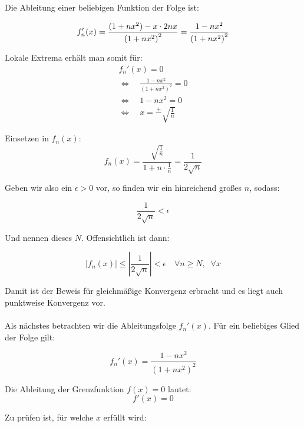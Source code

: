 \documentclass[a4paper,german,12pt,smallheadings]{scrartcl}
\begin{document}
Die Ableitung einer beliebigen Funktion der Folge ist:

\begin{equation*}
f_n'(x)=\frac{(1+nx^2)- x\cdot 2nx}{\left(1+nx^2\right)^2}=\frac{1-nx^2}{\left(1+nx^2\right)^2}\\
\end{equation*}

Lokale Extrema erhält man somit für:
\begin{align*}
f_n'(x)=0\\
\Leftrightarrow \quad \frac{1-nx^2}{\left(1+nx^2\right)^2}=0\\
\Leftrightarrow \quad 1-nx^2=0\\
\Leftrightarrow \quad x=\overset{+}{-}\sqrt{\frac{1}{n}}
\end{align*}

Einsetzen in $f_n(x)$:
\begin{equation*}
f_n(x)=\frac{\sqrt{\frac{1}{n}}}{1+n\cdot\frac{1}{n}}=\frac{1}{2\sqrt{n}}
\end{equation*}

Geben wir also ein $\epsilon>0$ vor, so finden wir ein hinreichend großes $n$, sodass:

\begin{equation*}
\frac{1}{2\sqrt{n}} < \epsilon
\end{equation*}

Und nennen dieses $N$. Offensichtlich ist dann:

\begin{equation*}
|f_n(x)|\leq\left|\frac{1}{2\sqrt{n}}\right| < \epsilon \quad \forall n\geq N, \;\;\forall x
\end{equation*}

Damit ist der Beweis für gleichmäßige Konvergenz erbracht und es liegt auch punktweise Konvergenz vor.\\
\\

Als nächstes betrachten wir die Ableitungsfolge $f_n'(x)$. Für ein beliebiges Glied der Folge gilt:

\begin{equation*}
f_n'(x)=\frac{1-nx^2}{\left(1+nx^2\right)^2}
\end{equation*}

Die Ableitung der Grenzfunktion $f(x)=0$ lautet:
\begin{equation*}
f'(x)=0
\end{equation*}

Zu prüfen ist, für welche $x$ erfüllt wird:
\end{document}
